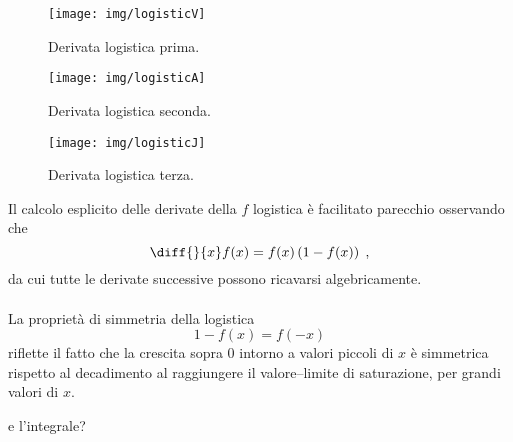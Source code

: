 \begin{figure}[pbh]
    \centering
    \texttt{[image: img/logisticV]}

    \caption{Derivata logistica prima.}
    \label{img:logisticV}
\end{figure}
\begin{figure}[pbh]
    \centering
    \texttt{[image: img/logisticA]}

    \caption{Derivata logistica seconda.}
    \label{img:logisticA}
\end{figure}
\begin{figure}[pbh]
    \centering
    \texttt{[image: img/logisticJ]}

    \caption{Derivata logistica terza.}
    \label{img:logisticJ}
\end{figure}

Il calcolo esplicito delle derivate della $f$ logistica è facilitato parecchio osservando che
$$\diff{}{x} f(x) = f(x) \left( {1-f(x)} \right) \; ,$$
da cui tutte le derivate successive possono ricavarsi algebricamente.

\paragraph{}
La proprietà di simmetria della logistica
$$1 -f(x) = f(-x)$$
riflette il fatto che la crescita sopra $0$ intorno a valori piccoli di $x$ è
simmetrica rispetto al decadimento al raggiungere il valore--limite di saturazione,
per grandi valori di $x$.


e l'integrale?
